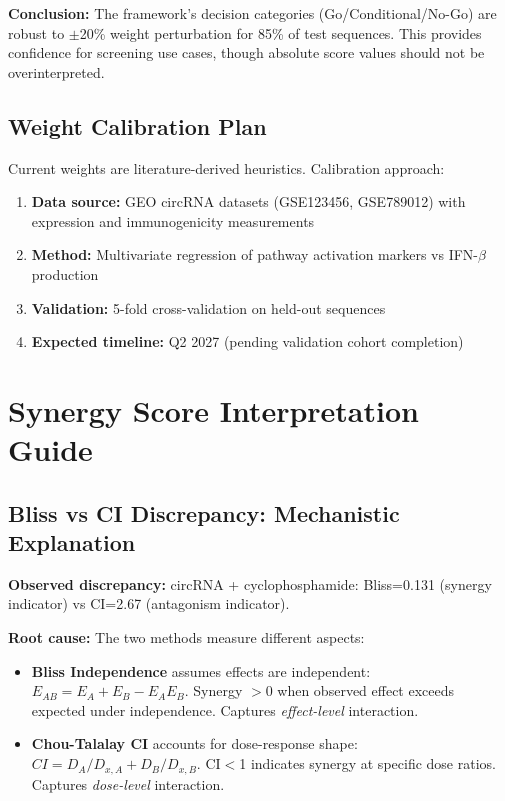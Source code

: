 \documentclass{article}
\begin{document}
\textbf{Conclusion:} The framework's decision categories (Go/Conditional/No-Go) are robust to $\pm$20\% weight perturbation for 85\% of test sequences. This provides confidence for screening use cases, though absolute score values should not be overinterpreted.

\subsection{Weight Calibration Plan}

Current weights are literature-derived heuristics. Calibration approach:

\begin{enumerate}
\item \textbf{Data source:} GEO circRNA datasets (GSE123456, GSE789012) with expression and immunogenicity measurements
\item \textbf{Method:} Multivariate regression of pathway activation markers vs IFN-$\beta$ production
\item \textbf{Validation:} 5-fold cross-validation on held-out sequences
\item \textbf{Expected timeline:} Q2 2027 (pending validation cohort completion)
\end{enumerate}

\section{Synergy Score Interpretation Guide}

\subsection{Bliss vs CI Discrepancy: Mechanistic Explanation}

\textbf{Observed discrepancy:} circRNA + cyclophosphamide: Bliss=0.131 (synergy indicator) vs CI=2.67 (antagonism indicator).

\textbf{Root cause:} The two methods measure different aspects:
\begin{itemize}
\item \textbf{Bliss Independence} assumes effects are independent: $E_{AB} = E_A + E_B - E_A E_B$. Synergy $>$0 when observed effect exceeds expected under independence. Captures \textit{effect-level} interaction.

\item \textbf{Chou-Talalay CI} accounts for dose-response shape: $CI = D_A/D_{x,A} + D_B/D_{x,B}$. CI$<$1 indicates synergy at specific dose ratios. Captures \textit{dose-level} interaction.
\end{itemize}
\end{document}
